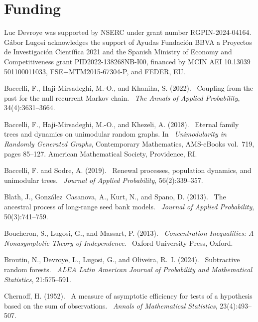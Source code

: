 \documentclass[12pt]{article}
\def\newblock{\ }%
\numberwithin{equation}{section} \font\titre=cmbx12
\begin{document}
\section*{Funding}
Luc Devroye was supported by NSERC
under grant number RGPIN-2024-04164.
G\'abor Lugosi acknowledges the support of Ayudas Fundación BBVA a
Proyectos de Investigación Científica 2021 and
the Spanish Ministry of Economy and Competitiveness grant PID2022-138268NB-I00, financed by MCIN AEI 10.13039 501100011033,
FSE+MTM2015-67304-P, and FEDER, EU.

%
%
\begin{thebibliography}{}

Baccelli, F., Haji-Mirsadeghi, M.-O., and Khaniha, S. (2022).
\newblock Coupling from the past for the null recurrent {M}arkov chain.
\newblock {\em The Annals of Applied Probability}, 34(4):3631--3664.


Baccelli, F., Haji-Mirsadeghi, M.-O., and Khezeli, A. (2018).
\newblock Eternal family trees and dynamics on unimodular random graphs.
In \newblock {\em Unimodularity in {R}andomly {G}enerated {G}raphs}, 
Contemporary Mathematics, AMS-eBooks vol.\ 719, pages 85--127.
American Mathematical Society, Providence, RI.


Baccelli, F. and Sodre, A. (2019).
\newblock Renewal processes, population dynamics, and unimodular trees.
\newblock {\em Journal of Applied Probability}, 56(2):339--357.

Blath, J., Gonz{\'a}lez~Casanova, A., Kurt, N., and Spano, D. (2013).
\newblock The ancestral process of long-range seed bank models.
\newblock {\em Journal of Applied Probability}, 50(3):741--759.

Boucheron, S., Lugosi, G., and Massart, P. (2013).
\newblock {\em Concentration Inequalities: A Nonasymptotic Theory of
  Independence}.
\newblock Oxford University Press, Oxford.

Broutin, N., Devroye, L., Lugosi, G., and Oliveira, R.~I. (2024).
\newblock Subtractive random forests.
\newblock {\em ALEA Latin American Journal of Probability and Mathematical
  Statistics}, 21:575--591.

Chernoff, H. (1952).
\newblock A measure of asymptotic efficiency for tests of a hypothesis based on
  the sum of observations.
\newblock {\em Annals of Mathematical Statistics}, 23(4):493--507.


\end{thebibliography}
\end{document}
